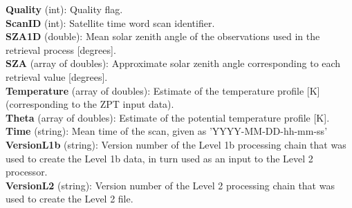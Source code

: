 \textbf{Quality} (int): Quality flag. \\ %

\textbf{ScanID} (int): Satellite time word scan identifier. \\

\textbf{SZA1D} (double): Mean solar zenith angle of the observations used in the retrieval process [degrees]. \\

\textbf{SZA} (array of doubles): Approximate solar zenith angle corresponding to each retrieval value [degrees]. \\ %

\textbf{Temperature} (array of doubles): Estimate of the temperature profile [K] (corresponding to the ZPT input data). \\ %

\textbf{Theta} (array of doubles): Estimate of the potential temperature profile [K]. \\

\textbf{Time} (string): Mean time of the scan, given as 'YYYY-MM-DD-hh-mm-ss' \\ %

\textbf{VersionL1b} (string): Version number of the Level 1b processing chain that was used to create the Level 1b data, in turn used as an input to the Level 2 processor. \\

\textbf{VersionL2} (string): Version number of the Level 2 processing chain that was used to create the Level 2 file. \\



